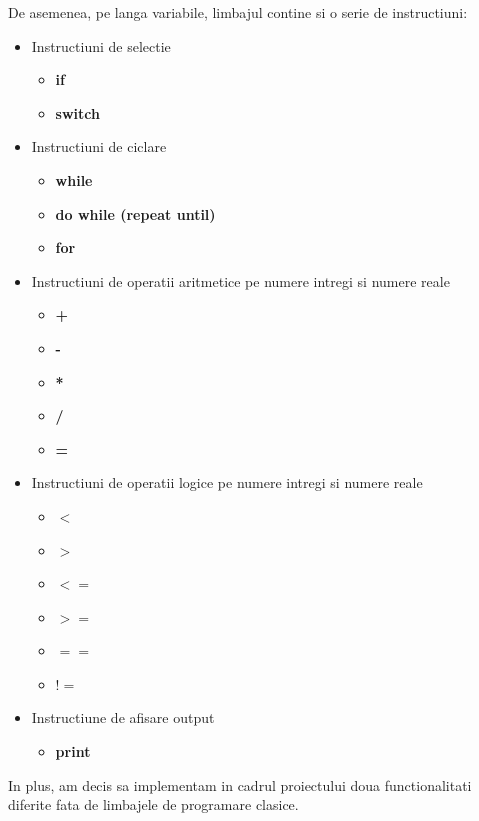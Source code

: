 \documentclass{article}
\begin{document}
De asemenea, pe langa variabile, limbajul contine si o serie de instructiuni:
\begin{itemize}
    \item Instructiuni de selectie
    \begin{itemize}
        \item \textbf{if}
        \item \textbf{switch}
    \end{itemize}
    \item Instructiuni de ciclare
    \begin{itemize}
        \item \textbf{while}
        \item \textbf{do while (repeat until)}
        \item  \textbf{for}
    \end{itemize}
    \item Instructiuni de operatii aritmetice pe numere intregi si numere reale
    \begin{itemize}
        \item \textbf{+}
        \item \textbf{-}
        \item \textbf{*}
        \item \textbf{/}
        \item \textbf{=}
    \end{itemize}
    \item Instructiuni de operatii logice pe numere intregi si numere reale
    \begin{itemize}
        \item \textbf{$<$}
        \item \textbf{$>$}
        \item \textbf{$<=$}
        \item \textbf{$>=$}
        \item \textbf{$==$}
        \item \textbf{$!=$}
    \end{itemize}
    \item Instructiune de afisare output
    \begin{itemize}
        \item \textbf{print}
    \end{itemize}
\end{itemize}


In plus, am decis sa implementam in cadrul proiectului doua functionalitati diferite fata de limbajele de programare clasice. \\
\end{document}
